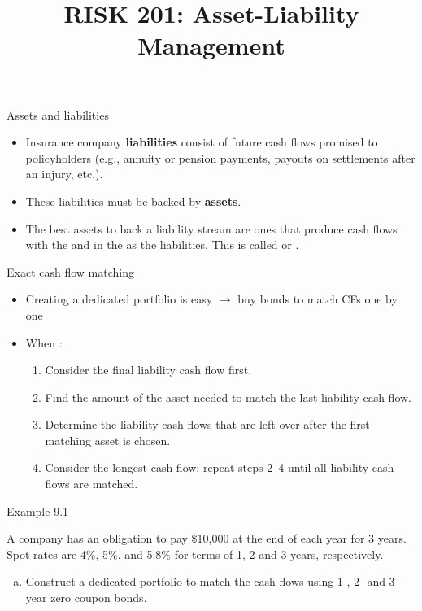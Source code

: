 \documentclass{beamer}
\title{RISK 201: Asset-Liability Management}
\begin{document}
\maketitle

\begin{frame}{Assets and liabilities}

\begin{itemize}
\item Insurance company \textbf{liabilities} consist of future cash flows promised to policyholders (e.g., annuity or pension payments, payouts on settlements after an injury, etc.).
\medskip
\item These liabilities must be backed by \textbf{assets}.
\medskip
\item The best assets to back a liability stream are ones that produce cash flows with the  and in the  as the liabilities. This is called  or .
\end{itemize}

\end{frame}

\begin{frame}{Exact cash flow matching}

\begin{itemize}
\item Creating a dedicated portfolio  is easy $\rightarrow$ buy bonds to match CFs one by one
\medskip
\item When :
\begin{enumerate}
\item Consider the final liability cash flow first.
\item Find the amount of the asset needed to match the last liability cash flow.
\item Determine the liability cash flows that are left over after the first matching asset is chosen.
\item Consider the longest  cash flow; repeat steps 2--4 until all liability cash flows are matched.
\end{enumerate}
\end{itemize}

\end{frame}

\begin{frame}{Example 9.1}

A company has an obligation to pay \$10,000 at the end of each year for 3 years. Spot rates are 4\%, 5\%, and 5.8\% for terms of 1, 2 and 3 years, respectively.
\begin{enumerate}[a)]
\item Construct a dedicated portfolio to match the cash flows using 1-, 2- and 3-year zero coupon bonds.
\end{enumerate}

\begin{center}
\end{center}

\vfill
\end{frame}
\end{document}
